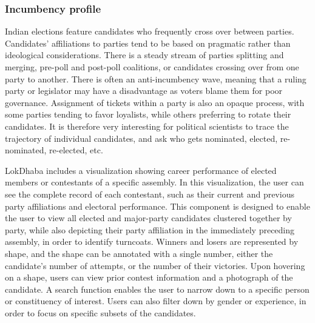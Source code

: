  \subsubsection{Incumbency profile}
Indian elections feature candidates who frequently cross over between parties. Candidates' affiliations to parties tend to be based on pragmatic rather than ideological considerations. There is a steady stream of parties splitting and merging, pre-poll and post-poll coalitions, or candidates crossing over from one party to another. There is often an anti-incumbency wave, meaning that a ruling party or legislator may have a disadvantage as voters blame them for poor governance. Assignment of tickets within a party is also an opaque process, with some parties tending to favor loyalists, while others preferring to rotate their candidates. It is therefore very interesting for political scientists to trace the trajectory of individual candidates, and ask who gets nominated, elected, re-nominated, re-elected, etc.

LokDhaba includes a visualization showing career performance of elected members or contestants of a specific assembly. In this visualization, the user can see the complete record of each contestant, such as their current and previous party affiliations and electoral performance. This component is designed to enable the user to view all elected and major-party candidates clustered together by party, while also depicting their party affiliation in the immediately preceding assembly, in order to identify turncoats. Winners and losers are represented by shape, and the shape can be annotated with a single number, either the candidate's number of attempts, or the number of their victories. Upon hovering on a shape, users can view prior contest information and a photograph of the candidate. A search function enables the user to narrow down to a specific person or constituency of interest. Users can also filter down by gender or experience, in order to focus on specific subsets of the candidates.
 
